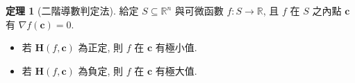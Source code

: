 \documentclass[12pt]{extarticle}
\newcommand{\ds}{\displaystyle}
\newcommand{\ifff}{\;\Longleftrightarrow\;}
\newcommand{\llt}{\left\langle}
\newcommand{\rgt}{\right\rangle}
\theoremstyle{definition}
\newtheorem*{thm}{定理}
\newtheorem*{ex}{例}
\newcommand{\vv}{\mathbf{v}}
\newcommand{\vc}{\mathbf{c}}
\newcommand{\vH}{\mathbf{H}}
\newcommand{\vA}{\mathbf{A}}
\begin{document}
%

\begin{thm}[二階導數判定法]
  給定 $\ds S\subseteq\mathbb{R}^n$ 與可微函數 $\ds f:S\to\mathbb{R}$, 且 $f$ 在 $S$ 之內點 $\vc$ 有 $\ds\nabla f(\vc) = 0$. 
  \begin{itemize}\setlength\itemsep{0em}
    \item 若 $\vH(f, \vc)$ 為正定, 則 $f$ 在 $\vc$ 有極小值. 
    \item 若 $\vH(f, \vc)$ 為負定, 則 $f$ 在 $\vc$ 有極大值. 
  \end{itemize}
\end{thm}
\end{document}
